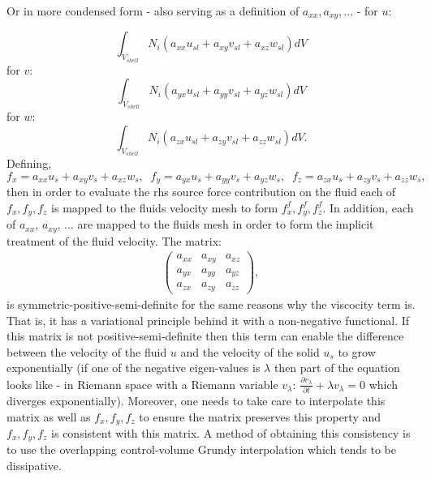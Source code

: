 Or in more condensed form - also serving as a definition of $a_{xx}, a_{xy},...$ - 
for $u$:

\begin{equation}
\int_{V_{shell}} 
N_i ( a_{xx} u_{sl} + a_{xy} v_{sl} + a_{xz} w_{sl} ) dV
\label{as-for-x} 
\end{equation}
for $v$: 
\begin{equation}
\int_{V_{shell}} 
N_i ( a_{yx} u_{sl} + a_{yy} v_{sl} + a_{yz} w_{sl} ) dV
\label{as-for-y} 
\end{equation}
for $w$:
\begin{equation}
\int_{V_{shell}} 
N_i ( a_{zx} u_{sl} + a_{zy} v_{sl} + a_{zz} w_{sl} ) dV. 
\label{as-for-z} 
\end{equation}
Defining, 
\begin{equation}
f_x=a_{xx} u_{s} + a_{xy} v_{s} + a_{xz} w_{s}, \;\;  
f_y=a_{yx} u_{s} + a_{yy} v_{s} + a_{yz} w_{s}, \;\;  
f_z=a_{zx} u_{s} + a_{zy} v_{s} + a_{zz} w_{s}, 
\label{as-for-f} 
\end{equation}
then in order to evaluate the rhs source force contribution on the 
fluid each of $f_x, f_y, f_z$ is mapped to the fluids velocity mesh 
to form $f_x^f, f_y^f, f_z^f$. In addition, each of $a_{xx}$, $a_{xy}$, ... 
are mapped to the fluids mesh in order to form the implicit treatment 
of the fluid velocity. 
The matrix: 
\begin{eqnarray}
\begin{pmatrix}
a_{xx} & a_{xy} & a_{xz} \\ 
a_{yx} & a_{yy} & a_{yz} \\ 
a_{zx} & a_{zy} & a_{zz} 
\end{pmatrix},  
\end{eqnarray}
is symmetric-positive-semi-definite for the same reasons why the viscocity term 
is. That is, it has a variational principle behind it with a non-negative functional. 
If this matrix is not positive-semi-definite then this term can enable the 
difference between the velocity of the fluid $u$ and the velocity of the solid $u_s$ to grow 
exponentially (if one of the negative eigen-values is $\lambda$ then part of the equation looks like 
- in Riemann space with a Riemann variable $v_\lambda$: $\frac{\partial v_\lambda}{\partial t} +\lambda v_\lambda=0$ which diverges exponentially). 
Moreover, one needs to take care to interpolate this matrix as well as $f_x, f_y, f_z$ 
to ensure the  matrix preserves this property and $f_x, f_y, f_z$  is consistent with this matrix. 
A method of obtaining this consistency is to use the overlapping control-volume Grundy interpolation which 
tends to be dissipative. 








